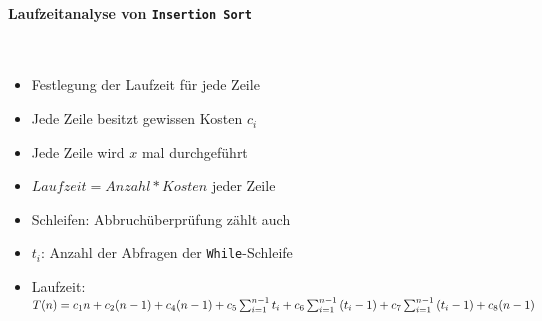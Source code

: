 \documentclass[
    ngerman,
    color=3b,
    dark_mode,
    summary,
    boxarc,
]{rubos-tuda-template}
\begin{document}
\paragraph{Laufzeitanalyse von \texttt{Insertion Sort}} {\label{insSortLaufzeit}}\mbox{}
\vspace*{1em}\\
\begin{minipage}[c]{0.3\textwidth}
    \mbox{}
    \centering
    \resetrc
    \label{tab:insertion-sort:laufzeit}
\end{minipage}
\begin{minipage}[c]{0.6\textwidth}
    \begin{itemize}
        \item Festlegung der Laufzeit für jede Zeile
        \item Jede Zeile besitzt gewissen Kosten \texttt{$c_i$}
        \item Jede Zeile wird $x$ mal durchgeführt
        \item $Laufzeit = Anzahl * Kosten$ jeder Zeile
        \item Schleifen: Abbruchüberprüfung zählt auch
        \item \texttt{$t_i$}: Anzahl der Abfragen der \texttt{While}-Schleife
        \item Laufzeit:
              $T(n)=c_{1} n+c_{2}(n-1)+c_{4}(n-1)+c_{5} \sum_{i=1}^{n-1} t_{i}\\ +c_{6} \sum_{i=1}^{n-1}\left(t_{i}-1\right)+c_{7} \sum_{i=1}^{n-1}\left(t_{i}-1\right)+c_{8}(n-1)$
    \end{itemize}
\end{minipage}
\end{document}

